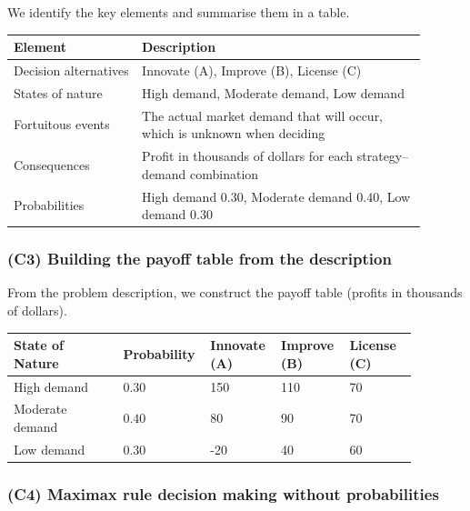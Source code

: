 \documentclass[11pt]{article}
\begin{document}
	We identify the key elements and summarise them in a table.
	
	\begin{center}
		\begin{tabular}{@{}p{0.28\linewidth}p{0.62\linewidth}@{}}
			\toprule
			Element & Description \\
			\midrule
			Decision alternatives & Innovate (A), Improve (B), License (C) \\
			States of nature & High demand, Moderate demand, Low demand \\
			Fortuitous events & The actual market demand that will occur, which is unknown when deciding \\
			Consequences & Profit in thousands of dollars for each strategy--demand combination \\
			Probabilities & High demand \(0.30\), Moderate demand \(0.40\), Low demand \(0.30\) \\
			\bottomrule
		\end{tabular}
	\end{center}
	
	\subsubsection{(C3) Building the payoff table from the description}\label{example-1-c3}
	
	From the problem description, we construct the payoff table (profits in thousands of dollars).
	
	\begin{center}
		\begin{tabular}{@{}p{0.26\linewidth}p{0.14\linewidth}p{0.16\linewidth}p{0.16\linewidth}p{0.16\linewidth}@{}}
			\toprule
			State of Nature & Probability & Innovate (A) & Improve (B) & License (C) \\
			\midrule
			High demand     & \(0.30\) & 150  & 110 & 70 \\
			Moderate demand & \(0.40\) & 80   & 90  & 70 \\
			Low demand      & \(0.30\) & -20  & 40  & 60 \\
			\bottomrule
		\end{tabular}
	\end{center}
	
	\subsubsection{(C4) Maximax rule decision making without probabilities}\label{example-1-c4}
	
\end{document}

